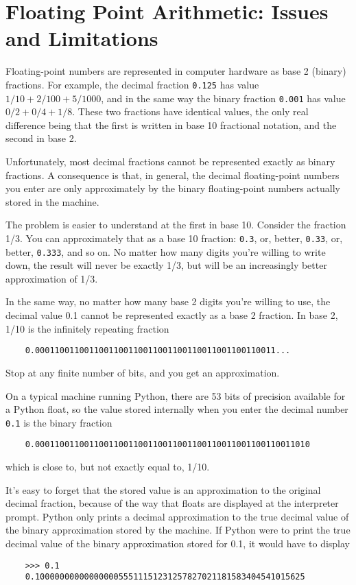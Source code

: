 \documentclass[UTF8]{article}
\begin{document}
\section{Floating Point Arithmetic: Issues and Limitations}
Floating-point numbers are represented in computer hardware as base 2 (binary) fractions. For
example, the decimal fraction \texttt{0.125} has value $1/10 + 2/100 + 5/1000$, and in the same way
the binary fraction \texttt{0.001} has value $0/2 + 0/4 + 1/8$. These two fractions have identical
values, the only real difference being that the first is written in base 10 fractional notation,
and the second in base 2.

Unfortunately, most decimal fractions cannot be represented exactly as binary fractions. A
consequence is that, in general, the decimal floating-point numbers you enter are only
approximately by the binary floating-point numbers actually stored in the machine.

The problem is easier to understand at the first in base 10. Consider the fraction 1/3. You can
approximately that as a base 10 fraction: \texttt{0.3}, or, better, \texttt{0.33}, or,
better, \texttt{0.333}, and so on. No matter how many digits you're willing to write down, the
result will never be exactly 1/3, but will be an increasingly better approximation of 1/3.

In the same way, no matter how many base 2 digits you're willing to use, the decimal value 0.1
cannot be represented exactly as a base 2 fraction. In base 2, 1/10 is the infinitely repeating
fraction
\begin{verbatim}
    0.0001100110011001100110011001100110011001100110011...
\end{verbatim}

Stop at any finite number of bits, and you get an approximation.

On a typical machine running Python, there are 53 bits of precision available for a Python float,
so the value stored internally when you enter the decimal number \texttt{0.1} is the binary
fraction
\begin{verbatim}
    0.00011001100110011001100110011001100110011001100110011010
\end{verbatim}
which is close to, but not exactly equal to, 1/10.

It's easy to forget that the stored value is an approximation to the original decimal fraction,
because of the way that floats are displayed at the interpreter prompt. Python only prints a
decimal approximation to the true decimal value of the binary approximation stored by the machine.
If Python were to print the true decimal value of the binary approximation stored for 0.1, it would
have to display
\begin{verbatim}
    >>> 0.1
    0.1000000000000000055511151231257827021181583404541015625
\end{verbatim}
\end{document}
